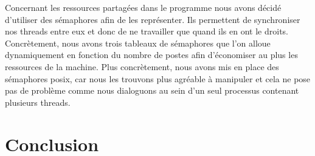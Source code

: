 \documentclass[11pt]{report}
\begin{document}
	Concernant les ressources partagées dans le programme nous avons décidé d'utiliser des sémaphores afin de les représenter. Ils permettent de synchroniser nos threads entre eux et donc de ne travailler que quand ils en ont le droits. Concrètement, nous avons trois tableaux de sémaphores que l'on alloue dynamiquement en fonction du nombre de postes afin d'économiser au plus les ressources de la machine. Plus concrètement, nous avons mis en place des sémaphores posix, car nous les trouvons plus agréable à manipuler et cela ne pose pas de problème comme nous dialoguons au sein d'un seul processus contenant plusieurs threads. 
\chapter{Conclusion}
\end{document}
